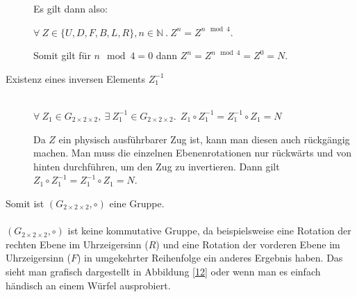 \documentclass[12pt,a4paper, usenames, dvipsnames]{article}
\newcommand{\Gtwo}{\ensuremath{G_{2\times 2\times 2}}}
\begin{document}
\begin{description}
Es gilt dann also:

$\forall \  Z \in \{U, D, F, B, L, R\}, n \in \mathbb{N} \ . \ Z^n=Z^{n \mod 4}$.

Somit gilt für $n \mod 4 = 0$ dann $Z^n = Z^{n \mod 4} = Z^0 = N$.


\item [Existenz eines inversen Elements $Z_1^{-1}$] \ \\
$\forall \  Z_1 \in \Gtwo,\ \exists \  Z_1^{-1} \in \Gtwo.  \ \ Z_1 \circ Z_1^{-1} = Z_1^{-1} \circ Z_1 = N$  


Da $Z$ ein physisch ausführbarer Zug ist, kann man diesen auch rückgängig machen. Man muss die einzelnen Ebenenrotationen nur rückwärts und von hinten durchführen, um den Zug zu invertieren. Dann gilt $Z_1 \circ Z_1^{-1} = Z_1^{-1} \circ Z_1 = N$.
\end{description}
Somit ist $(\Gtwo, \circ)$ eine Gruppe. \\ 
\\
$(\Gtwo, \circ)$ ist keine kommutative Gruppe, da beispielsweise eine Rotation der rechten Ebene im Uhrzeigersinn ($R$) und eine Rotation der vorderen Ebene im Uhrzeigersinn ($F$) in umgekehrter Reihenfolge ein anderes Ergebnis haben. Das sieht man grafisch dargestellt in Abbildung \ref{12} oder wenn man es einfach händisch an einem Würfel ausprobiert.
\end{document}
